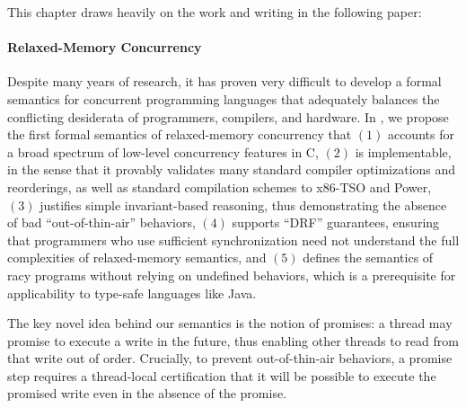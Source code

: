 

This chapter draws heavily on the work and writing in the following paper:


\paragraph{Relaxed-Memory Concurrency}

Despite many years of research, it has proven very difficult to develop a formal semantics for
concurrent programming languages that adequately balances the conflicting desiderata of programmers,
compilers, and hardware.  In , we propose the first formal semantics of
relaxed-memory concurrency that $(1)$ accounts for a broad spectrum of low-level concurrency
features in C, $(2)$ is implementable, in the sense that it provably validates many standard
compiler optimizations and reorderings, as well as standard compilation schemes to x86-TSO and
Power, $(3)$ justifies simple invariant-based reasoning, thus demonstrating the absence of bad
``out-of-thin-air'' behaviors, $(4)$ supports ``DRF'' guarantees, ensuring that programmers who use
sufficient synchronization need not understand the full complexities of relaxed-memory semantics,
and $(5)$ defines the semantics of racy programs without relying on undefined behaviors, which is a
prerequisite for applicability to type-safe languages like Java.

The key novel idea behind our semantics is the notion of promises: a thread may promise to execute a
write in the future, thus enabling other threads to read from that write out of order.  Crucially,
to prevent out-of-thin-air behaviors, a promise step requires a thread-local certification that it
will be possible to execute the promised write even in the absence of the promise.

